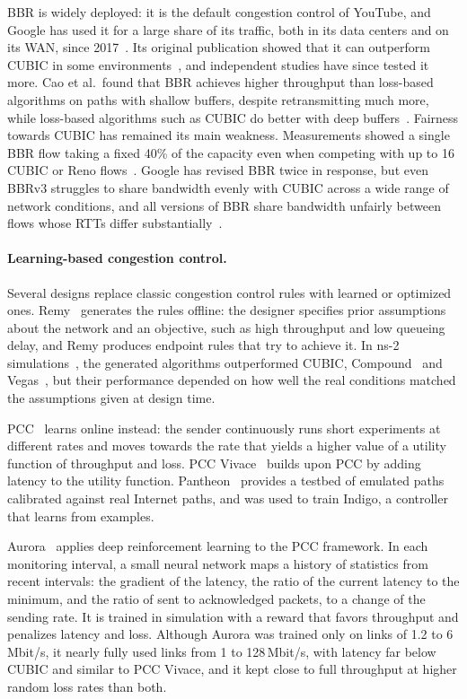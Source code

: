 BBR is widely deployed: it is the default congestion control of YouTube, and Google
has used it for a large share of its traffic, both in its data centers and on its WAN,
since 2017~\cite{ware2019modeling,zeynali2024promises}. Its original publication
showed that it can outperform CUBIC in some environments~\cite{cardwell2016bbr}, and
independent studies have since tested it more. Cao et al.\ found that BBR achieves
higher throughput than loss-based algorithms on paths with shallow buffers, despite
retransmitting much more, while loss-based algorithms such as CUBIC do better with deep
buffers~\cite{cao2019when}. Fairness towards CUBIC has remained
its main weakness. Measurements showed a single BBR flow taking a fixed 40\% of the
capacity even when competing with up to 16 CUBIC or Reno flows~\cite{ware2019modeling}. Google has revised BBR twice in response, but even BBRv3
struggles to share bandwidth evenly with CUBIC across a wide range of network
conditions, and all versions of BBR share bandwidth unfairly between flows whose RTTs
differ substantially~\cite{zeynali2024promises}.

\paragraph{Learning-based congestion control.} Several designs replace classic congestion
control rules with learned or optimized ones. Remy~\cite{winstein2013remy} generates the rules offline: the
designer specifies prior assumptions about the network and an objective, such as high
throughput and low queueing delay, and Remy produces endpoint rules that try to
achieve it. In ns-2 simulations~\cite{ns2}, the generated algorithms
outperformed CUBIC, Compound~\cite{tan2006compound} and Vegas~\cite{brakmo1994vegas}, but their performance depended on how well the
real conditions matched the assumptions given at design time.

PCC~\cite{dong2015pcc} learns online
instead: the sender continuously runs short experiments at different rates and moves
towards the rate that yields a higher value of a utility function of throughput and
loss. PCC Vivace~\cite{dong2018vivace} builds upon PCC by adding latency to the utility function. Pantheon~\cite{yan2018pantheon} provides a testbed of emulated paths
calibrated against real Internet paths, and was used to train Indigo, a controller that
learns from examples.

Aurora~\cite{jay2019aurora} applies deep reinforcement learning
to the PCC framework. In each monitoring interval, a small neural network maps a
history of statistics from recent intervals: the gradient of the latency, the
ratio of the current latency to the minimum, and the ratio of sent to acknowledged
packets, to a change of the sending rate. It is trained in simulation with a reward
that favors throughput and penalizes latency and loss. Although Aurora was trained
only on links of 1.2 to 6\,Mbit/s, it nearly fully used links from 1 to
128\,Mbit/s, with latency far below CUBIC and similar to PCC Vivace, and it kept close
to full throughput at higher random loss rates than both.

